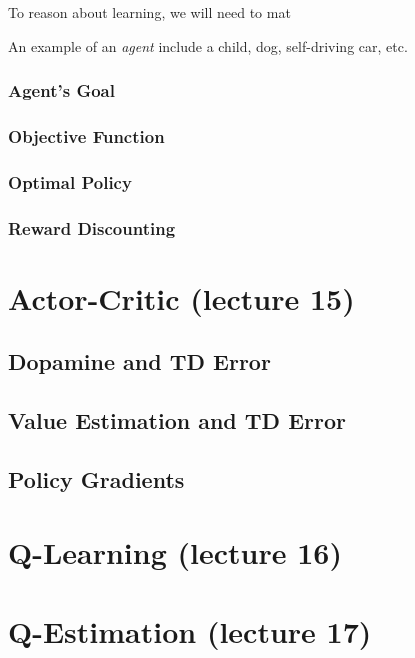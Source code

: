 \documentclass[11pt]{article}
\numberwithin{equation}{section}
\theoremstyle{definition}%
\begin{document}
To reason about learning, we will need to mat

An example of an \emph{agent} include a child, dog, self-driving car, etc. 



\subsubsection{Agent's Goal}


\subsubsection*{Objective Function}

\subsubsection*{Optimal Policy}

\subsubsection*{Reward Discounting}

\section{Actor-Critic (lecture 15)}

\subsection{Dopamine and TD Error}

\subsection{Value Estimation and TD Error}

\subsection{Policy Gradients}


\section{Q-Learning (lecture 16)}


\section{Q-Estimation (lecture 17)}
\end{document}
